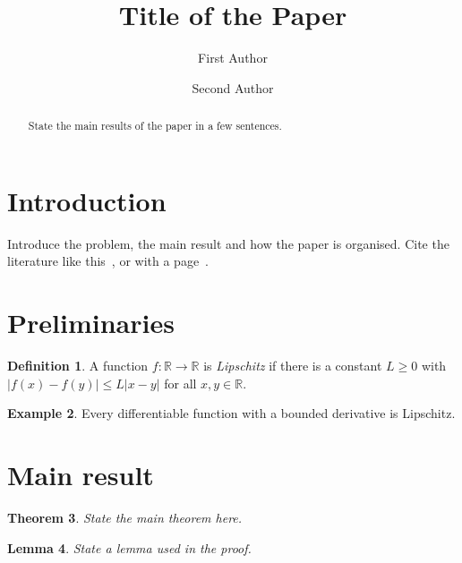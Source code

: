 \documentclass{amsart}
\newtheorem{theorem}{Theorem}[section]
\newtheorem{lemma}[theorem]{Lemma}
\theoremstyle{definition}
\newtheorem{definition}[theorem]{Definition}
\newtheorem{example}[theorem]{Example}
\theoremstyle{remark}
\numberwithin{equation}{section}
\begin{document}
\title[Short title]{Title of the Paper}

\author{First Author}
\address{Department of Mathematics, University, City, Country}

\author{Second Author}
\address{Institute, City, Country}


\begin{abstract}
State the main results of the paper in a few sentences.
\end{abstract}

\maketitle

\section{Introduction}
Introduce the problem, the main result and how the paper is organised. Cite
the literature like this~\cite{hardy2008introduction}, or with a page~\cite[p.~5]{rudin1987real}.

\section{Preliminaries}
\begin{definition}
A function $f\colon \mathbb{R} \to \mathbb{R}$ is \emph{Lipschitz} if there is
a constant $L \ge 0$ with $\lvert f(x) - f(y) \rvert \le L \lvert x - y \rvert$
for all $x, y \in \mathbb{R}$.
\end{definition}

\begin{example}
Every differentiable function with a bounded derivative is Lipschitz.
\end{example}

\section{Main result}
\begin{theorem}\label{thm:main}
State the main theorem here.
\end{theorem}

\begin{lemma}\label{lem:key}
State a lemma used in the proof.
\end{lemma}
\end{document}
